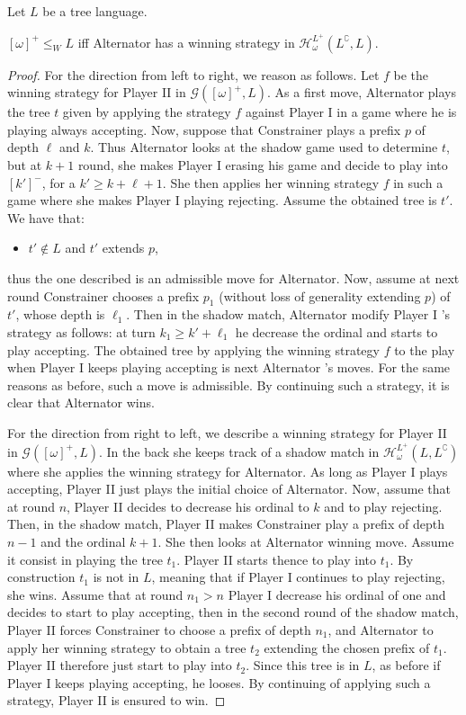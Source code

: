 \begin{proposition}\label{prop:omega} Let $L$ be a tree language.

$[\omega]^+ \leq_W L$ iff Alternator has a winning strategy in $\mathcal{H}^{L^+}_\omega(L^\complement, L)$. 

\end{proposition}
\begin{proof}
For the direction from left to right, we reason as follows. Let $f$ be the winning strategy for Player II in $\mathcal{G}([\omega]^+, L)$. As a first move, Alternator plays the tree $t$ given by applying the strategy $f$ against Player I in a game where he is playing always accepting. Now, suppose that Constrainer plays a prefix $p$ of depth $\ell$ and $k$. Thus Alternator looks at the shadow game used to determine $t$, but at $k+1$ round, she makes Player I erasing his game and decide to play into $[k']^-$, for a $k' \geq k + \ell +1$. She then  applies her winning strategy $f$ in such a game where she makes Player I  playing rejecting. Assume the obtained tree is $t'$. We have that:
\begin{itemize}
\item $t' \notin L$ and $t'$ extends $p$,
\end{itemize}
thus the one described is an admissible move for Alternator.
Now, assume at next round Constrainer chooses a prefix $p_1$ (without loss of generality extending $p$) of $t'$, whose depth is $\ell_1$. Then in the shadow match, Alternator modify Player I 's strategy as follows: at turn $k_1 \geq k' + \ell_1$ he decrease the ordinal and starts to play accepting. The obtained tree by applying the winning strategy $f$ to the play when  Player  I keeps playing accepting is next Alternator 's moves. For the same reasons as before, such a move is admissible. By continuing such a strategy, it is clear that Alternator wins.

For the direction from right to left, we describe a winning strategy for Player II in $\mathcal{G}([\omega]^+, L)$. In the back she keeps track of a shadow match in $\mathcal{H}^{L^+}_\omega(L, L^\complement)$ where she applies the  winning strategy for Alternator. 
As long as Player I plays accepting, Player II just plays the initial choice of Alternator. Now, assume that at round $n$, Player II decides to decrease his ordinal to $k$ and to play rejecting. Then, in the shadow match, Player II makes Constrainer play a prefix of depth $n-1$ and the ordinal $k+1$. She then looks at Alternator winning move. Assume it consist in playing the tree $t_1$. Player II starts thence to play into $t_1$. By construction $t_1$ is not in $L$, meaning that if Player I continues to play rejecting, she wins. Assume that at round $n_1> n$ Player I decrease his ordinal of one and decides to start to play accepting, then in the second round of the shadow match, Player II forces Constrainer to choose a prefix of depth $n_1$, and Alternator to apply her winning strategy to obtain a tree $t_2$ extending the chosen prefix of $t_1$. Player II therefore just start to play into $t_2$. Since this tree is in $L$, as before if Player I keeps playing accepting, he looses. By continuing of applying such a strategy, Player II is ensured to win. 
\end{proof}


